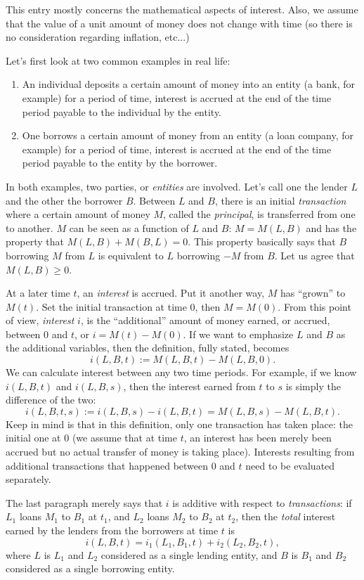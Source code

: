 \documentclass[12pt]{article}
\begin{document}
This entry mostly concerns the mathematical aspects of interest.  Also, we assume that the value of a unit amount of money does not change with time (so there is no consideration regarding inflation, etc...)

Let's first look at two common examples in real life:
\begin{enumerate}
\item An individual deposits a certain amount of money into an entity (a bank, for example) for a period of time, interest is accrued at the end of the time period payable to the individual by the entity.
\item One borrows a certain amount of money from an entity (a loan company, for example) for a period of time, interest is accrued at the end of the time period payable to the entity by the borrower.
\end{enumerate}

In both examples, two parties, or \emph{entities} are involved.  Let's call one the lender $L$ and the other the borrower $B$.  Between $L$ and $B$, there is an initial \emph{transaction} where a certain amount of money $M$, called the \emph{principal}, is transferred from one to another.  $M$ can be seen as a function of $L$ and $B$: $M=M(L,B)$ and has the property that $M(L,B)+M(B,L)=0$.  This property basically says that $B$ borrowing $M$ from $L$ is equivalent to $L$ borrowing $-M$ from $B$.  Let us agree that $M(L,B)\ge 0$.

At a later time $t$, an \emph{interest} is accrued.  Put it another way, $M$ has ``grown'' to $M(t)$.  Set the initial transaction at time $0$, then $M=M(0)$.  From this point of view, \emph{interest} $i$, is the ``additional'' amount of money earned, or accrued, between $0$ and $t$, or $i=M(t)-M(0)$.  If we want to emphasize $L$ and $B$ as the additional variables, then the definition, fully stated, becomes
$$i(L,B,t):=M(L,B,t)-M(L,B,0).$$
We can calculate interest between any two time periods.  For example, if we know $i(L,B,t)$ and $i(L,B,s)$, then the interest earned from $t$ to $s$ is simply the difference of the two: $$i(L,B,t,s):=i(L,B,s)-i(L,B,t)=M(L,B,s)-M(L,B,t).$$
Keep in mind is that in this definition, only one transaction has taken place: the initial one at $0$ (we assume that at time $t$, an interest has been merely been accrued but no actual transfer of money is taking place).  Interests resulting from additional transactions that happened between $0$ and $t$ need to be evaluated separately.

The last paragraph merely says that $i$ is additive with respect to \emph{transactions}: if $L_1$ loans $M_1$ to $B_1$ at $t_1$, and $L_2$ loans $M_2$ to $B_2$ at $t_2$, then the \emph{total} interest earned by the lenders from the borrowers at time $t$ is $$i(L,B,t)= i_1(L_1,B_1,t)+ i_2(L_2,B_2,t),$$
where $L$ is $L_1$ and $L_2$ considered as a single lending entity, and $B$ is $B_1$ and $B_2$ considered as a single borrowing entity.
\end{document}
